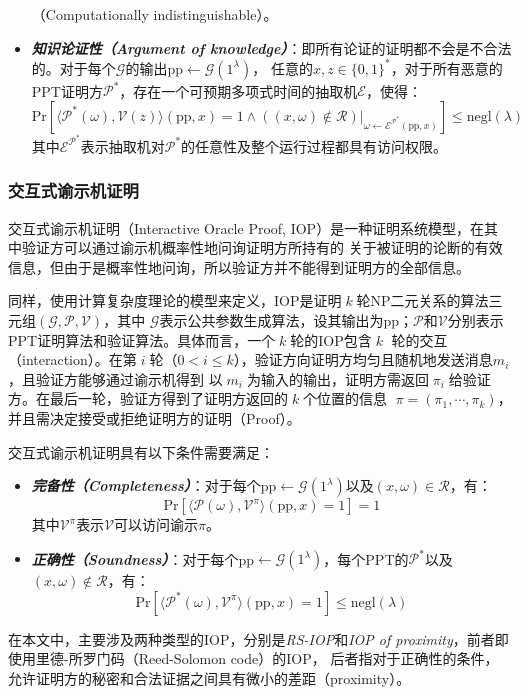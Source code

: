 \documentclass[zihao=-4]{ctexart}
\begin{document}
\begin{spacing}{1.5}
\begin{itemize}
      （Computationally indistinguishable）。
  \item \textbf{\emph{知识论证性（Argument of knowledge）}}：即所有论证的证明都不会是不合法的。对于每个$\mathcal{G}$的输出pp$\leftarrow\mathcal{G}(1^{\lambda})$，
      任意的$x,z\in\{0,1\}^*$，对于所有恶意的PPT证明方$\mathcal{P^*}$，存在一个可预期多项式时间的抽取机$\mathcal{E}$，使得：
      \[\text{Pr}[\langle \mathcal{P^*}(\omega),\mathcal{V}(z)\rangle(\text{pp},x)=1\wedge((x,\omega)\not\in\mathcal{R})|_{\omega\leftarrow\mathcal{E}^{\mathcal{P^*}}(\text{pp},x)}]\le\text{negl}(\lambda)\]
      其中$\mathcal{E}^{\mathcal{P}^*}$表示抽取机对$\mathcal{P^*}$的任意性及整个运行过程都具有访问权限。
\end{itemize}

\subsubsection{交互式谕示机证明}
交互式谕示机证明\cite{seven}\cite{Thirty-nine}（Interactive Oracle Proof, IOP）是一种证明系统模型，在其中验证方可以通过谕示机概率性地问询证明方所持有的
关于被证明的论断的有效信息，但由于是概率性地问询，所以验证方并不能得到证明方的全部信息。\par
同样，使用计算复杂度理论的模型来定义，IOP是证明$\;k\;$轮NP二元关系的算法三元组$(\mathcal{G},\mathcal{P},\mathcal{V})$，其中
$\mathcal{G}$表示公共参数生成算法，设其输出为pp；$\mathcal{P}$和$\mathcal{V}$分别表示PPT证明算法和验证算法。具体而言，一个$\;k\;$轮的IOP包含$\;k\;$
轮的交互（interaction）。在第$\;i\;$轮（$0<i\le k$），验证方向证明方均匀且随机地发送消息$m_i$，且验证方能够通过谕示机得到
以$\;m_i\;$为输入的输出，证明方需返回$\;\pi_i\;$给验证方。在最后一轮，验证方得到了证明方返回的$\;k\;$个位置的信息
$\;\pi=(\pi_1,\cdots,\pi_k)$，并且需决定接受或拒绝证明方的证明（Proof）。\par
交互式谕示机证明\cite{six}具有以下条件需要满足：
\begin{itemize}
  \item \textbf{\emph{完备性（Completeness）}}：对于每个pp$\leftarrow\mathcal{G}(1^{\lambda})$以及$(x,\omega)\in\mathcal{R}$，有：
        \[\text{Pr}[\langle \mathcal{P}(\omega),\mathcal{V}^{\pi}\rangle(\text{pp},x)=1]=1\]
        其中$\mathcal{V}^{\pi}$表示$\mathcal{V}$可以访问谕示$\pi$。
  \item \textbf{\emph{正确性（Soundness）}}：对于每个pp$\leftarrow\mathcal{G}(1^{\lambda})$，每个PPT的$\mathcal{P^*}$以及$(x,\omega)\not\in\mathcal{R}$，有：
        \[\text{Pr}[\langle \mathcal{P}^*(\omega),\mathcal{V}^{\pi}\rangle(\text{pp},x)=1]\le\text{negl}(\lambda)\]
\end{itemize}\par
在本文中，主要涉及两种类型的IOP，分别是\emph{RS-IOP}和\emph{IOP of proximity}，前者即使用里德-所罗门码（Reed-Solomon code）的IOP，
后者指对于正确性的条件，允许证明方的秘密和合法证据之间具有微小的差距（proximity）。


\end{spacing}
\end{document}
